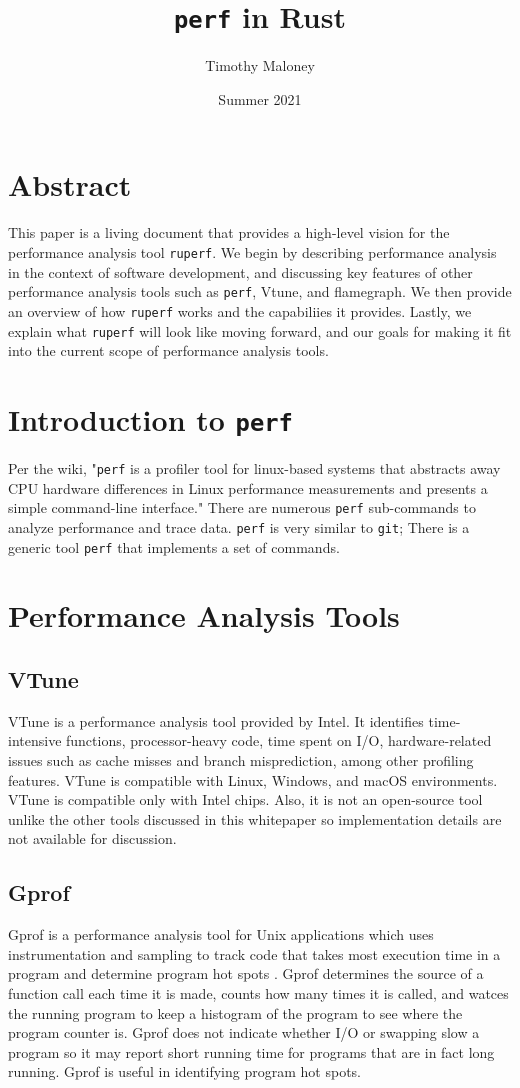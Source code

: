 \documentclass{article}
\title{\texttt{perf} in Rust}
\author{Timothy Maloney}
\date{Summer 2021}
\begin{document}
\maketitle
\section*{Abstract}
This paper is a living document that provides a high-level vision for the performance analysis tool \texttt{ruperf}.
We begin by describing performance analysis in the context of software development, and discussing key features of other 
performance analysis tools such as \texttt{perf}, Vtune, and flamegraph. We then provide an overview of how \texttt{ruperf} works
and the capabiliies it provides. Lastly, we explain what \texttt{ruperf} will look like moving forward, and our goals for making it 
fit into the current scope of performance analysis tools.
\pagebreak
\section{Introduction to \texttt{perf}}
Per the wiki, "\texttt{perf} is a profiler tool for linux-based systems that abstracts away CPU hardware differences in Linux performance measurements and presents a simple command-line interface." There are numerous \texttt{perf} sub-commands to analyze performance and trace data. \texttt{perf} is very similar to \texttt{git}; There is a generic tool \texttt{perf} that
implements a set of commands.
\section{Performance Analysis Tools}
\subsection{VTune}
VTune is a performance analysis tool provided by Intel. It identifies
time-intensive functions, processor-heavy code, time spent on I/O,
hardware-related issues such as cache misses and branch misprediction, among
other profiling features. VTune is compatible with Linux, Windows, and macOS
environments. VTune is compatible only with Intel chips. Also, it is not an
open-source tool unlike the other tools discussed in this whitepaper so
implementation details are not available for discussion.
\subsection{Gprof}
Gprof is a performance analysis tool for Unix applications which uses
instrumentation and sampling to track code that takes most execution time in a
program and determine program hot spots . Gprof determines the source of a
function call each time it is made, counts how many times it is called, and
watces the
running program to keep a histogram of the program to see where the program
counter is. Gprof does not indicate whether I/O or swapping slow a program so it
may report short running time for programs that are in fact long running. Gprof
is useful in identifying program hot spots.
\end{document}
